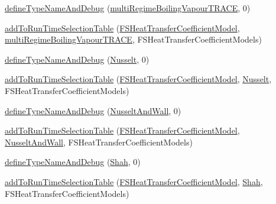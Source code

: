 \begin{DoxyCompactItemize}
\item 
\hyperlink{namespaceFoam_1_1FSHeatTransferCoefficientModels_ab747c627fa795640127151443b94f504}{define\+Type\+Name\+And\+Debug} (\hyperlink{classFoam_1_1FSHeatTransferCoefficientModels_1_1multiRegimeBoilingVapourTRACE}{multi\+Regime\+Boiling\+Vapour\+T\+R\+A\+CE}, 0)
\item 
\hyperlink{namespaceFoam_1_1FSHeatTransferCoefficientModels_abb2c5a93f0e21f3d1c296b6324a0ddb3}{add\+To\+Run\+Time\+Selection\+Table} (\hyperlink{classFoam_1_1FSHeatTransferCoefficientModel}{F\+S\+Heat\+Transfer\+Coefficient\+Model}, \hyperlink{classFoam_1_1FSHeatTransferCoefficientModels_1_1multiRegimeBoilingVapourTRACE}{multi\+Regime\+Boiling\+Vapour\+T\+R\+A\+CE}, F\+S\+Heat\+Transfer\+Coefficient\+Models)
\item 
\hyperlink{namespaceFoam_1_1FSHeatTransferCoefficientModels_aa6a9b0191f7bdee4c445c53d9be8881c}{define\+Type\+Name\+And\+Debug} (\hyperlink{classFoam_1_1FSHeatTransferCoefficientModels_1_1Nusselt}{Nusselt}, 0)
\item 
\hyperlink{namespaceFoam_1_1FSHeatTransferCoefficientModels_af38cfccb40c483ccc30bf67afc8481b5}{add\+To\+Run\+Time\+Selection\+Table} (\hyperlink{classFoam_1_1FSHeatTransferCoefficientModel}{F\+S\+Heat\+Transfer\+Coefficient\+Model}, \hyperlink{classFoam_1_1FSHeatTransferCoefficientModels_1_1Nusselt}{Nusselt}, F\+S\+Heat\+Transfer\+Coefficient\+Models)
\item 
\hyperlink{namespaceFoam_1_1FSHeatTransferCoefficientModels_a115fd7eb1c901dbfb149cbd609f02f67}{define\+Type\+Name\+And\+Debug} (\hyperlink{classFoam_1_1FSHeatTransferCoefficientModels_1_1NusseltAndWall}{Nusselt\+And\+Wall}, 0)
\item 
\hyperlink{namespaceFoam_1_1FSHeatTransferCoefficientModels_a5b3af641d5fed809f962aa0bb77b7908}{add\+To\+Run\+Time\+Selection\+Table} (\hyperlink{classFoam_1_1FSHeatTransferCoefficientModel}{F\+S\+Heat\+Transfer\+Coefficient\+Model}, \hyperlink{classFoam_1_1FSHeatTransferCoefficientModels_1_1NusseltAndWall}{Nusselt\+And\+Wall}, F\+S\+Heat\+Transfer\+Coefficient\+Models)
\item 
\hyperlink{namespaceFoam_1_1FSHeatTransferCoefficientModels_a8c27110573122b19b9cbebf0b67037f7}{define\+Type\+Name\+And\+Debug} (\hyperlink{classFoam_1_1FSHeatTransferCoefficientModels_1_1Shah}{Shah}, 0)
\item 
\hyperlink{namespaceFoam_1_1FSHeatTransferCoefficientModels_a1cc1e3ecf6587c98e98d4dafd7cc6f2e}{add\+To\+Run\+Time\+Selection\+Table} (\hyperlink{classFoam_1_1FSHeatTransferCoefficientModel}{F\+S\+Heat\+Transfer\+Coefficient\+Model}, \hyperlink{classFoam_1_1FSHeatTransferCoefficientModels_1_1Shah}{Shah}, F\+S\+Heat\+Transfer\+Coefficient\+Models)

\end{DoxyCompactItemize}
